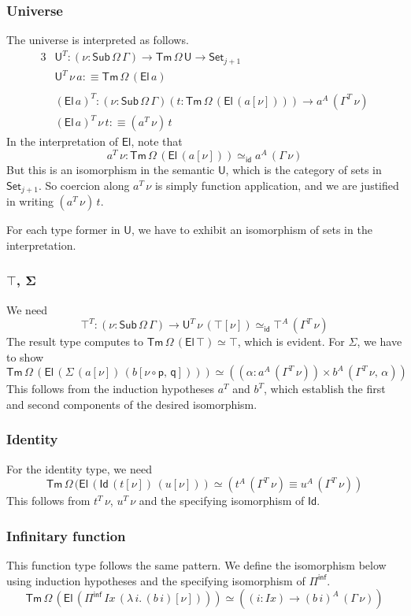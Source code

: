 \documentclass[12pt,a4paper,twoside,openany]{book}
\theoremstyle{remark}
\theoremstyle{definition}
\theoremstyle{theorem}
\newcommand{\mi}[1]{\mathit{#1}}
\newcommand{\bs}[1]{\boldsymbol{#1}}
\newcommand{\id}{\mathsf{id}}
\newcommand{\Sub}{\mathsf{Sub}}
\newcommand{\Tm}{\mathsf{Tm}}
\newcommand{\U}{\mathsf{U}}
\newcommand{\El}{\mathsf{El}}
\newcommand{\Id}{\mathsf{Id}}
\newcommand{\Set}{\mathsf{Set}}
\newcommand{\Piinf}{\Pi^{\mathsf{inf}}}
\newcommand{\p}{\mathsf{p}}
\newcommand{\q}{\mathsf{q}}
\newcommand{\defn}{:\equiv}
\begin{document}
\subsubsection{Universe}
The universe is interpreted as follows.
\begin{alignat*}{3}
  &\U^T : (\nu : \Sub\,\Omega\,\Gamma) \to \Tm\,\Omega\,\U \to \Set_{j + 1} \\
  &\U^T\,\nu\,a \defn \Tm\,\Omega\,(\El\,a) \\
  &\\
  &(\El\,a)^T : (\nu : \Sub\,\Omega\,\Gamma)(t : \Tm\,\Omega\,(\El\,(a[\nu]))) \to a^A\,(\Gamma^T\,\nu)\\
  &(\El\,a)^T\,\nu\,t \defn (a^T\,\nu)\,t
\end{alignat*}
In the interpretation of $\El$, note that
\[
a^T\,\nu : \Tm\,\Omega\,(\El\,(a[\nu])) \simeq_{\id} a^A\,(\Gamma\,\nu)
\]
But this is an isomorphism in the semantic $\U$, which is the category of sets
in $\Set_{j + 1}$. So coercion along $a^T\,\nu$ is simply function application,
and we are justified in writing $(a^T\,\nu)\,t$.

For each type former in $\U$, we have to exhibit an isomorphism of sets in the
interpretation.

\subsubsection{$\bs{\top}$, $\bs{\Sigma}$}
We need
\[
  \top^T : (\nu : \Sub\,\Omega\,\Gamma) \to \U^T\,\nu\,(\top[\nu]) \simeq_{\id} \top^A\,(\Gamma^T\,\nu)
\]
The result type computes to $\Tm\,\Omega\,(\El\,\top) \simeq \top$, which is evident. For $\Sigma$, we
have to show
\[
   \Tm\,\Omega\,(\El\,(\Sigma\,(a[\nu])\,(b[\nu\circ\p,\,\q]))) \simeq ((\alpha : a^A\,(\Gamma^T\,\nu)) \times b^A\,(\Gamma^T\,\nu,\,\alpha))
\]
This follows from the induction hypotheses $a^T$ and $b^T$, which establish the
first and second components of the desired isomorphism.

\subsubsection{Identity}
For the identity type, we need
\[
  \Tm\,\Omega\,(\El\,(\Id\,(t[\nu])\,(u[\nu])) \simeq (t^A\,(\Gamma^T\,\nu) \equiv u^A\,(\Gamma^T\,\nu))
\]
This follows from $t^T\,\nu$, $u^T\,\nu$ and the specifying isomorphism of
$\Id$.

\subsubsection{Infinitary function}
This function type follows the same pattern. We define the isomorphism below
using induction hypotheses and the specifying isomorphism of $\Piinf$.
\[
\Tm\,\Omega\,(\El\,(\Piinf\,\mi{Ix}\,(\lambda\,i.\,(b\,i)[\nu])))
\simeq
((i : \mi{Ix}) \to (b\,i)^A\,(\Gamma\,\nu))
\]
\end{document}
